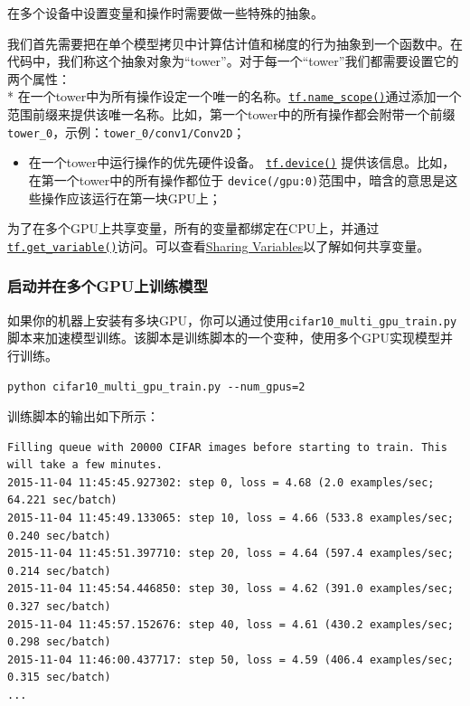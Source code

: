 在多个设备中设置变量和操作时需要做一些特殊的抽象。

我们首先需要把在单个模型拷贝中计算估计值和梯度的行为抽象到一个函数中。在代码中，我们称这个抽象对象为``tower''。对于每一个``tower''我们都需要设置它的两个属性：\\
*
在一个tower中为所有操作设定一个唯一的名称。\href{https://github.com/jikexueyuanwiki/tensorflow-zh/blob/master/SOURCE/api_docs/python/framework.md\#name_scope}{\texttt{tf.name\_scope()}}通过添加一个范围前缀来提供该唯一名称。比如，第一个tower中的所有操作都会附带一个前缀\texttt{tower\_0}，示例：\texttt{tower\_0/conv1/Conv2D}；

\begin{itemize}
\tightlist
\item
  在一个tower中运行操作的优先硬件设备。
  \href{https://github.com/jikexueyuanwiki/tensorflow-zh/blob/master/SOURCE/api_docs/python/framework.md\#device}{\texttt{tf.device()}}
  提供该信息。比如，在第一个tower中的所有操作都位于
  \texttt{device(\textquotesingle{}/gpu:0\textquotesingle{})}范围中，暗含的意思是这些操作应该运行在第一块GPU上；
\end{itemize}

为了在多个GPU上共享变量，所有的变量都绑定在CPU上，并通过\href{https://github.com/jikexueyuanwiki/tensorflow-zh/blob/master/SOURCE/api_docs/python/state_ops.md\#get_variable}{\texttt{tf.get\_variable()}}访问。可以查看\href{https://github.com/jikexueyuanwiki/tensorflow-zh/blob/master/SOURCE/how_tos/variables/index.md}{Sharing
Variables}以了解如何共享变量。

\subsubsection{启动并在多个GPU上训练模型
}\label{ux542fux52a8ux5e76ux5728ux591aux4e2agpuux4e0aux8badux7ec3ux6a21ux578b}

如果你的机器上安装有多块GPU，你可以通过使用\texttt{cifar10\_multi\_gpu\_train.py}脚本来加速模型训练。该脚本是训练脚本的一个变种，使用多个GPU实现模型并行训练。

\begin{verbatim}
python cifar10_multi_gpu_train.py --num_gpus=2
\end{verbatim}

训练脚本的输出如下所示：

\begin{verbatim}
Filling queue with 20000 CIFAR images before starting to train. This will take a few minutes.
2015-11-04 11:45:45.927302: step 0, loss = 4.68 (2.0 examples/sec; 64.221 sec/batch)
2015-11-04 11:45:49.133065: step 10, loss = 4.66 (533.8 examples/sec; 0.240 sec/batch)
2015-11-04 11:45:51.397710: step 20, loss = 4.64 (597.4 examples/sec; 0.214 sec/batch)
2015-11-04 11:45:54.446850: step 30, loss = 4.62 (391.0 examples/sec; 0.327 sec/batch)
2015-11-04 11:45:57.152676: step 40, loss = 4.61 (430.2 examples/sec; 0.298 sec/batch)
2015-11-04 11:46:00.437717: step 50, loss = 4.59 (406.4 examples/sec; 0.315 sec/batch)
...
\end{verbatim}

